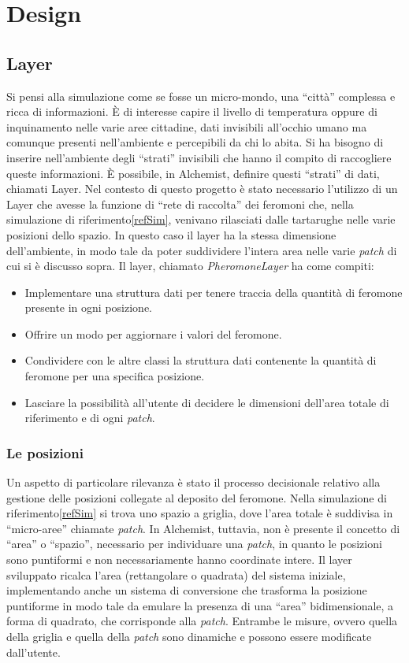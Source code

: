 \chapter{Design}
\section{Layer}
Si pensi alla simulazione come se fosse un micro-mondo, una ``città'' complessa
e ricca di informazioni. È di interesse capire il livello di temperatura oppure di inquinamento nelle varie aree cittadine, dati invisibili
all'occhio umano ma comunque presenti nell'ambiente e percepibili da chi lo abita. Si ha bisogno
di inserire nell'ambiente degli ``strati'' invisibili che hanno il compito di raccogliere queste informazioni.
È possibile, in Alchemist, definire questi ``strati'' di dati, chiamati Layer.
\newline
Nel contesto di questo progetto è stato necessario l'utilizzo di un Layer che avesse la funzione di ``rete di raccolta''
dei feromoni che, nella simulazione di riferimento\space\ref{refSim}, venivano rilasciati dalle tartarughe nelle varie posizioni
dello spazio. In questo caso il layer ha la stessa dimensione dell'ambiente, in modo tale da poter suddividere l'intera area nelle varie \textit{patch} di cui si 
è discusso sopra.
Il layer, chiamato \textit{PheromoneLayer} ha come compiti:
\begin{itemize}
    \item Implementare una struttura dati per tenere traccia della quantità di feromone presente in ogni posizione.
    \item Offrire un modo per aggiornare i valori del feromone.
    \item Condividere con le altre classi la struttura dati contenente la quantità di feromone per una specifica posizione.
    \item Lasciare la possibilità all'utente di decidere le dimensioni dell'area totale di riferimento e di ogni \textit{patch}.
\end{itemize}

\subsection{Le posizioni}
Un aspetto di particolare rilevanza è stato il processo decisionale relativo alla gestione delle posizioni collegate 
al deposito del feromone. Nella simulazione di riferimento\space\ref{refSim} si trova uno spazio a griglia, dove l'area totale è suddivisa
in ``micro-aree'' chiamate \textit{patch}. In Alchemist, tuttavia, non è presente il concetto di ``area'' o ``spazio'', necessario per individuare una \textit{patch},
in quanto le posizioni sono puntiformi e non necessariamente hanno coordinate intere. Il layer sviluppato ricalca l'area (rettangolare o quadrata) del sistema iniziale,
implementando anche un sistema di conversione che trasforma la posizione puntiforme in modo tale da emulare la presenza di una ``area'' bidimensionale, a forma di quadrato, che corrisponde alla \textit{patch}.
Entrambe le misure, ovvero quella della griglia e quella della \textit{patch} sono dinamiche e possono essere modificate dall'utente.

